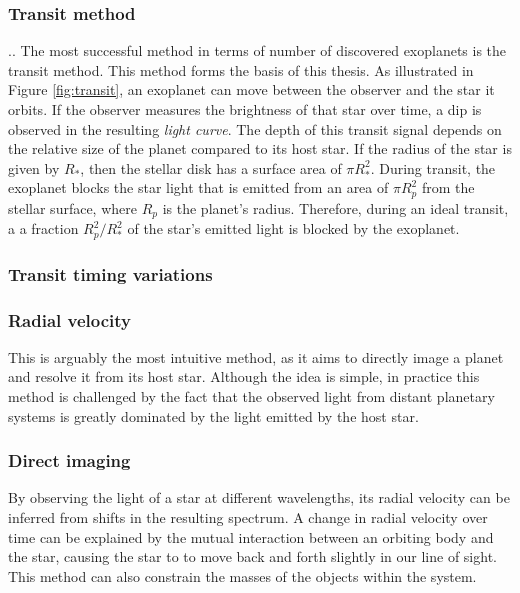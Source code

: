 \subsubsection{Transit method}
..
The most successful method in terms of number of discovered exoplanets is the transit method. This method forms the basis of this thesis. As illustrated in Figure \ref{fig:transit}, an exoplanet can move between the observer and the star it orbits. If the observer measures the brightness of that star over time, a dip is observed in the resulting \textit{light curve}. The depth of this transit signal depends on the relative size of the planet compared to its host star. If the radius of the star is given by $R_*$, then the stellar disk has a surface area of $\pi R_*^2$. During transit, the exoplanet blocks the star light that is emitted from an area of $\pi R_{p}^2$ from the stellar surface, where $R_{p}$ is the planet's radius. Therefore, during an ideal transit, a a fraction $R_{p}^2/R_*^2$ of the star's emitted light is blocked by the exoplanet.


\subsubsection{Transit timing variations}
\red{[TODO]}

\subsubsection{Radial velocity}
\red{[}This is arguably the most intuitive method\red{]}, as it aims to directly image a planet and resolve it from its host star. Although the idea is simple, in practice this method is challenged by the fact that the observed light from distant planetary systems is greatly dominated by the light emitted by the host star.
\subsubsection{Direct imaging}
By observing the light of a star at different wavelengths, its radial velocity can be inferred from shifts in the resulting spectrum. A change in radial velocity over time can be explained by the mutual interaction between an orbiting body and the star, causing the star to to move back and forth slightly in our line of sight. This method can also constrain the masses of the objects within the system.
